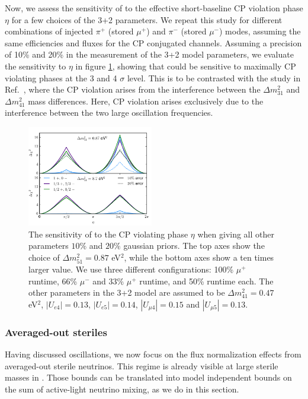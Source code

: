 Now, we assess the sensitivity of \nus to the effective short-baseline CP violation phase $\eta$ for a few choices of the 3+2 parameters. We repeat this study for different combinations of injected $\pi^+$ (stored $\mu^+$) and $\pi^-$ (stored $\mu^-$) modes, assuming the same efficiencies and fluxes for the CP conjugated channels.  Assuming a precision of 10\% and 20\% in the measurement of the 3+2 model parameters, we evaluate the sensitivity to $\eta$ in figure \ref{fig:CP1D}, showing that \nus could be sensitive to maximally CP violating phases at the 3 and 4 $\sigma$ level. This is to be contrasted with the study in Ref.~\cite{DeGouvea2015a}, where the CP violation arises from the interference between the $\Delta m^2_{31}$ and $\Delta m^2_{41}$ mass differences. Here, CP violation arises exclusively due to the interference between the two large oscillation frequencies.
%
\begin{figure}[t]
\centering
\includegraphics[width=0.49\textwidth]{figs/CP_sensitivity.pdf}
\caption[The sensitivity of \nus to short-baseline CP violation in a 3+2 model.]{The sensitivity of \nus to the CP violating phase $\eta$ when giving all other parameters $10 \%$ and $20 \%$ gaussian priors. The top axes show the choice of $\Delta m^2_{51} = 0.87 $ eV$^2$, while the bottom axes show a ten times larger value. We use three different configurations: 100\% $\mu^+$  runtime, 66\% $\mu^-$ and 33\% $\mu^+$ runtime, and 50\% runtime each. The other parameters in the 3+2 model are assumed to be $\Delta m^2_{41} = 0.47 $ eV$^2$, $|U_{e4}|=0.13$, $|U_{e5}|=0.14$, $|U_{\mu4}|=0.15$ and $|U_{\mu5}|=0.13$. \label{fig:CP1D}}
\end{figure}
%

\subsubsection{Averaged-out steriles}
  
Having discussed oscillations, we now focus on the flux normalization effects from averaged-out sterile neutrinos. This regime is already visible at large sterile masses in . Those bounds can be translated into model independent bounds on the sum of active-light neutrino mixing, as we do in this section. 

